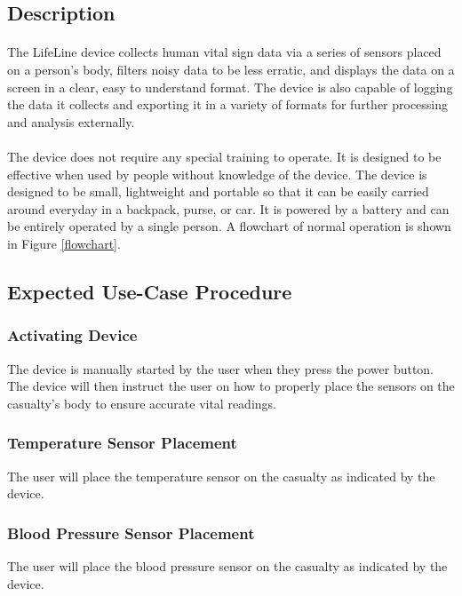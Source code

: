 \documentclass{article}
\begin{document}
	\subsection{Description}
	\paragraph{}
	The LifeLine device collects human vital sign data via a series of sensors placed on a person's body, filters noisy data to be less erratic, and displays the data on a screen in a clear, easy to understand format. The device is also capable of logging the data it collects and exporting it in a variety of formats for further processing and analysis externally. 
    \paragraph{}
    The device does not require any special training to operate. It is designed to be effective when used by people without knowledge of the device. The device is designed to be small, lightweight and portable so that it can be easily carried around everyday in a backpack, purse, or car. It is powered by a battery and can be entirely operated by a single person.  A flowchart of normal operation is shown in Figure \ref{flowchart}.
    
	\subsection{Expected Use-Case Procedure }
	
	\subsubsection{Activating Device}
	The device is manually started by the user when they press the power button. The device will then instruct the user on how to properly place the sensors on the casualty's body to ensure accurate vital readings. 
	\subsubsection{Temperature Sensor Placement}
	The user will place the temperature sensor on the casualty as indicated by the device. 
	\subsubsection{Blood Pressure Sensor Placement}
	The user will place the blood pressure sensor on the casualty as indicated by the device. 
\end{document}
